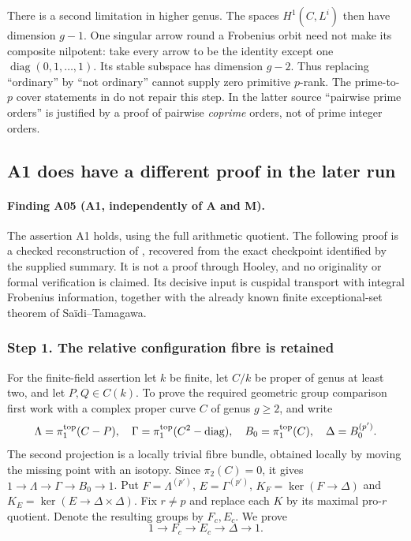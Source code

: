 There is a second limitation in higher genus. The spaces $H^1(C,L^i)$
then have dimension $g-1$. One singular arrow round a Frobenius orbit
need not make its composite nilpotent: take every arrow to be the
identity except one $\operatorname{diag}(0,1,\ldots,1)$.
Its stable subspace has dimension $g-2$. Thus replacing ``ordinary''
by ``not ordinary'' cannot supply zero primitive $p$-rank. The prime-to-$p$ cover statements in
\cite[Propositions~2.3--2.4]{PopSaidi} do not repair this
step. In the latter source ``pairwise prime orders'' is justified by
a proof of pairwise \emph{coprime} orders, not of prime integer orders.

\subsection{A1 does have a different proof in the later run}

\paragraph{Finding A05 (A1, independently of A and M).}
The assertion A1 holds, using the full arithmetic quotient. The
following proof is a checked reconstruction of
\cite[A.2--A.5, A.14--A.19, A.30--A.33]{A1run}, recovered from the
exact checkpoint identified by the supplied summary. It is not a
proof through Hooley, and no originality or formal verification is
claimed. Its decisive input is cuspidal transport with integral
Frobenius information, together with the already known finite
exceptional-set theorem of Sa\"idi--Tamagawa.

\subsubsection*{Step 1. The relative configuration fibre is retained}
For the finite-field assertion let $k$ be finite, let $C/k$ be proper
of genus at least two, and let $P,Q\in C(k)$. To prove the required
geometric group comparison first work with a complex proper curve
$C$ of genus $g\ge2$, and write
\[
 \Lambda=\pi_1^{\rm top}(C-P),\quad
 \Gamma=\pi_1^{\rm top}(C^2-\operatorname{diag}),\quad
 B_0=\pi_1^{\rm top}(C),\quad \Delta=B_0^{(p')}.
\]
The second projection is a locally trivial fibre bundle, obtained
locally by moving the missing point with an isotopy. Since
$\pi_2(C)=0$, it gives $1\to\Lambda\to\Gamma\to B_0\to1$.
Put $F=\Lambda^{(p')}$, $E=\Gamma^{(p')}$,
$K_F=\ker(F\to\Delta)$ and
$K_E=\ker(E\to\Delta\times\Delta)$. Fix $r\ne p$ and replace
each $K$ by its maximal pro-$r$ quotient. Denote the resulting
groups by $F_c,E_c$. We prove
\[
 1\longrightarrow F_c\longrightarrow E_c\longrightarrow\Delta
 \longrightarrow1. \tag{A05.1}
\]

